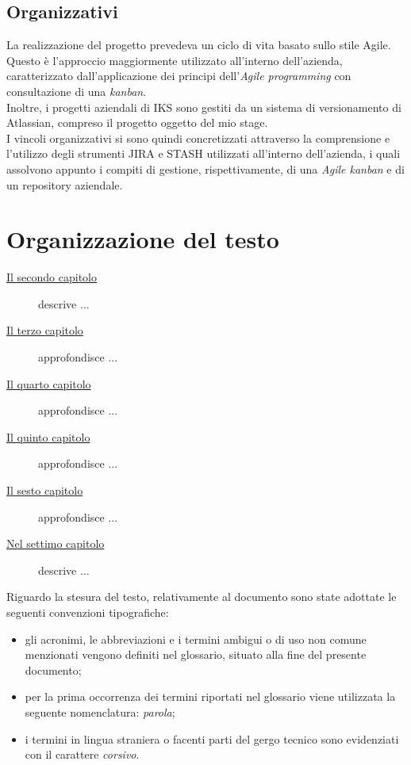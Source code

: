 \subsection{Organizzativi}
La realizzazione del progetto prevedeva un ciclo di vita basato sullo stile Agile. Questo è l'approccio maggiormente utilizzato all'interno dell'azienda, caratterizzato dall'applicazione dei principi dell'\emph{Agile programming} con consultazione di una \emph{kanban}.\\
Inoltre, i progetti aziendali di IKS sono gestiti da un sistema di versionamento di Atlassian, compreso il progetto oggetto del mio stage.\\
I vincoli organizzativi si sono quindi concretizzati attraverso la comprensione e l'utilizzo degli strumenti JIRA e STASH utilizzati all'interno dell'azienda, i quali assolvono appunto i compiti di gestione, rispettivamente, di una \emph{Agile kanban} e di un repository aziendale.



\section{Organizzazione del testo}

\begin{description}
    \item[{\hyperref[cap:processi-metodologie]{Il secondo capitolo}}] descrive ...
    
    \item[{\hyperref[cap:descrizione-stage]{Il terzo capitolo}}] approfondisce ...
    
    \item[{\hyperref[cap:analisi-requisiti]{Il quarto capitolo}}] approfondisce ...
    
    \item[{\hyperref[cap:progettazione-codifica]{Il quinto capitolo}}] approfondisce ...
    
    \item[{\hyperref[cap:verifica-validazione]{Il sesto capitolo}}] approfondisce ...
    
    \item[{\hyperref[cap:conclusioni]{Nel settimo capitolo}}] descrive ...
\end{description}

Riguardo la stesura del testo, relativamente al documento sono state adottate le seguenti convenzioni tipografiche:
\begin{itemize}
	\item gli acronimi, le abbreviazioni e i termini ambigui o di uso non comune menzionati vengono definiti nel glossario, situato alla fine del presente documento;
	\item per la prima occorrenza dei termini riportati nel glossario viene utilizzata la seguente nomenclatura: \emph{parola}\glsfirstoccur;
	\item i termini in lingua straniera o facenti parti del gergo tecnico sono evidenziati con il carattere \emph{corsivo}.
\end{itemize}